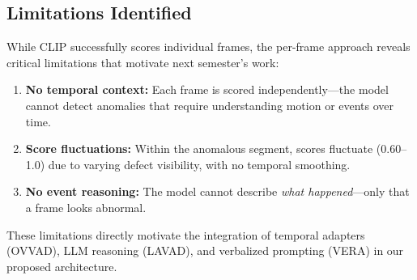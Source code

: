 \subsection{Limitations Identified}

While CLIP successfully scores individual frames, the per-frame approach reveals critical limitations that motivate next semester's work:

\begin{enumerate}[leftmargin=*]
    \item \textbf{No temporal context:} Each frame is scored independently---the model cannot detect anomalies that require understanding motion or events over time.
    \item \textbf{Score fluctuations:} Within the anomalous segment, scores fluctuate (0.60--1.0) due to varying defect visibility, with no temporal smoothing.
    \item \textbf{No event reasoning:} The model cannot describe \textit{what happened}---only that a frame looks abnormal.
\end{enumerate}

These limitations directly motivate the integration of temporal adapters (OVVAD), LLM reasoning (LAVAD), and verbalized prompting (VERA) in our proposed architecture.

